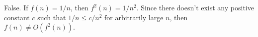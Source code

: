 False.
If $f(n)=1/n$, then $f^2(n)=1/n^2$.
Since there doesn't exist any positive constant $c$ such that $1/n\le c/n^2$ for arbitrarily large $n$, then $f(n)\ne O(f^2(n))$.
